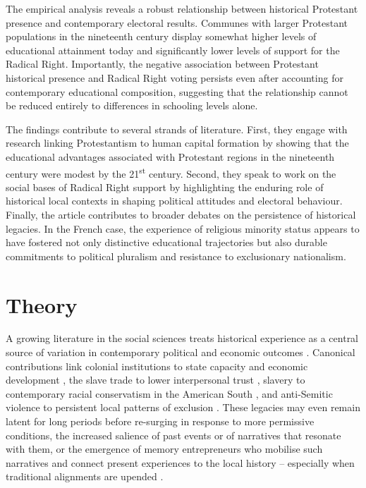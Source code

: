 \documentclass[12pt]{article}
\begin{document}
The empirical analysis reveals a robust relationship between historical Protestant presence and contemporary electoral results. Communes with larger Protestant populations in the nineteenth century display somewhat higher levels of educational attainment today and significantly lower levels of support for the Radical Right. Importantly, the negative association between Protestant historical presence and Radical Right voting persists even after accounting for contemporary educational composition, suggesting that the relationship cannot be reduced entirely to differences in schooling levels alone.

The findings contribute to several strands of literature. First, they engage with research linking Protestantism to human capital formation by showing that the educational advantages associated with Protestant regions in the nineteenth century were modest by the 21\textsuperscript{st} century. Second, they speak to work on the social bases of Radical Right support by highlighting the enduring role of historical local contexts in shaping political attitudes and electoral behaviour. Finally, the article contributes to broader debates on the persistence of historical legacies. In the French case, the experience of religious minority status appears to have fostered not only distinctive educational trajectories but also durable commitments to political pluralism and resistance to exclusionary nationalism.

\section{Theory}

A growing literature in the social sciences treats historical experience as a central source of variation in contemporary political and economic outcomes \parencite{simpserDeadNotGone2018, abadHistoryNeverReally2021, charnyshHistoricalPoliticalEconomy2023}. 
Canonical contributions link colonial institutions to state capacity and economic development \parencite{acemogluColonialOriginsComparative2001, nunnLongtermEffectsAfricas2008}, the slave trade to lower interpersonal trust \parencite{nunnSlaveTradeOrigins2011}, slavery to contemporary racial conservatism in the American South \parencite{acharyaPoliticalLegacyAmerican2016}, and anti-Semitic violence to persistent local patterns of exclusion \parencite{voigtlanderPersecutionPerpetuatedMedieval2012}. These legacies may even remain latent for long periods before re-surging in response to more permissive conditions, the increased salience of past events or of narratives that resonate with them, or the emergence of memory entrepreneurs who mobilise such narratives and connect present experiences to the local history -- especially when traditional alignments are upended \parencite{wittenbergCruciblesPoliticalLoyalty2006, dinasInterruptedContinuitiesLocal2024, ochsnerActivatedHistoryCase2024, foukaCollectiveRemembrancePrivate2023}.
\end{document}
